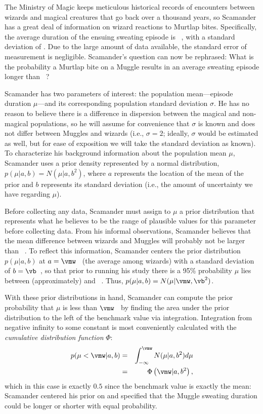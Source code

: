 The Ministry of Magic keeps meticulous historical records of encounters between wizards and magical creatures that go back over a thousand years, so Scamander has a great deal of information on wizard reactions to Murtlap bites. Specifically, the average duration of the ensuing sweating episode is \vmw~\units, with a standard deviation of \vsigma. Due to the large amount of data available, the standard error of measurement is negligible. Scamander's question can now be rephrased: What is the probability a Murtlap bite on a Muggle results in an average sweating episode longer than \vmw~\units? 

Scamander has two parameters of interest: the population mean---episode duration $\mu$---and its corresponding population standard deviation $\sigma$. He has no reason to believe there is a difference in dispersion between the magical and non-magical populations, so he will assume for convenience that $\sigma$ is known and does not differ between Muggles and wizards (i.e., $\sigma=2$; ideally, $\sigma$ would be estimated as well, but for ease of exposition we will take the standard deviation as known). 
To characterize his background information about the population mean $\mu$, Scamander uses a prior density represented by a normal distribution, $p(\mu|a,b)=N(\mu|a,b^2)$, where $a$ represents the location of the mean of the prior and $b$ represents its standard deviation (i.e., the amount of uncertainty we have regarding $\mu$).

Before collecting any data, Scamander must assign to $\mu$ a prior distribution that represents what he believes to be the range of plausible values for this parameter before collecting data. From his informal observations, Scamander believes that the mean difference between wizards and Muggles will probably not be larger than ~\units. 
To reflect this information, Scamander centers the prior distribution $p(\mu|a,b)$ at $a = \vmw$~\units{} (the average among wizards) with a standard deviation of $b = \vb$~\units, so that prior to running his study there is a 95\% probability $\mu$ lies between (approximately) and ~\units. Thus, $p(\mu|a,b) = N(\mu | \vmw, \vb^2)$.

With these prior distributions in hand, Scamander can compute the prior probability that $\mu$ is less than $\vmw$~\units{} by finding the area under the prior distribution to the left of the benchmark value via integration. Integration from negative infinity to some constant is most conveniently calculated with the \emph{cumulative distribution function} $\Phi$:
\begin{eqnarray*}
p(\mu < \vmw|a,b) &=& \int_{-\infty}^{\vmw}N(\mu|a,b^2)d\mu\\
                  &=& \Phi\left(\vmw | a, b^2\right),
\end{eqnarray*}
which in this case is exactly $0.5$ since the benchmark value is exactly the mean: Scamander centered his prior on \vmw{ }and specified that the Muggle sweating duration could be longer or shorter with equal probability. 

